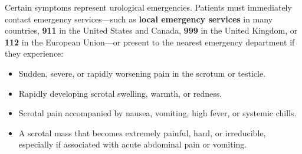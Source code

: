 Certain symptoms represent urological emergencies. Patients must immediately contact emergency services---such as \textbf{local emergency services} in many countries, \textbf{911} in the United States and Canada, \textbf{999} in the United Kingdom, or \textbf{112} in the European Union---or present to the nearest emergency department if they experience:
\begin{itemize}
  \item Sudden, severe, or rapidly worsening pain in the scrotum or testicle.
  \item Rapidly developing scrotal swelling, warmth, or redness.
  \item Scrotal pain accompanied by nausea, vomiting, high fever, or systemic chills.
  \item A scrotal mass that becomes extremely painful, hard, or irreducible, especially if associated with acute abdominal pain or vomiting.
\end{itemize}

